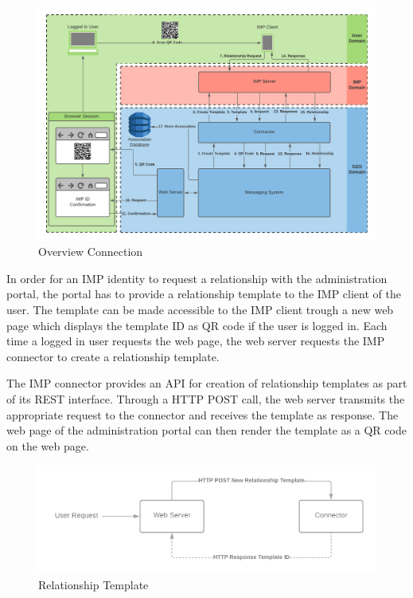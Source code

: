 \begin{figure}[h]
    \centering
    \caption{Overview Connection}
    \includegraphics[scale=0.2]{Diagrams/Integration Architecture 1/Messaging/Connection/Technological Integration Connection.png}
\end{figure}

In order for an IMP identity to request a relationship with the administration portal, the portal has to provide a relationship template to the IMP client of the user. The template can be made accessible to the IMP client trough a new web page which displays the template ID as QR code if the user is logged in. Each time a logged in user requests the web page, the web server requests the IMP connector to create a relationship template.

The IMP connector provides an API for creation of relationship templates as part of its REST interface. Through a HTTP POST call, the web server transmits the appropriate request to the connector and receives the template as response. The web page of the administration portal can then render the template as a QR code on the web page.

\begin{figure}[h]
    \centering
    \caption{Relationship Template}
    \includegraphics[scale=0.3]{Diagrams/Integration Architecture 1/Overview/Relationship Template REST.png}
\end{figure}

